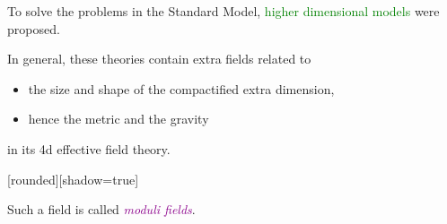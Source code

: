 \documentclass[
  unicode,a4paper,11pt,aspectratio=169,
  xcolor = {dvipsnames,svgnames},
  hyperref ={colorlinks=true,citecolor=Navy,linkcolor=NavyBlue,urlcolor=purple},
  ja=standard,lualatex
]{beamer}
\renewcommand{\theequation}{\thesection.\arabic{equation}}
\renewcommand{\thefigure}{\thesection.\arabic{figure}}
\renewcommand{\thetable}{\thesection.\arabic{table}}
\begin{document}
\begin{frame}

  To solve the problems in the Standard Model, \textcolor{Green}{higher dimensional models} were proposed.

  \vspace{10pt}

  \pause

  In general, these theories contain extra fields related to
  \begin{itemize}
    \item
          the size and shape of the compactified extra dimension,
    \item
          hence the metric and the gravity
  \end{itemize}
  in its 4d effective field theory.

  \vspace{10pt}

  \pause

  [rounded][shadow=true]

  \begin{block}{}
    \centering
    \large
    Such a field is called \textcolor{DarkMagenta}{\textit{moduli fields}}.
  \end{block}

\end{frame}


\begin{frame}

  




\end{frame}





\end{document}
